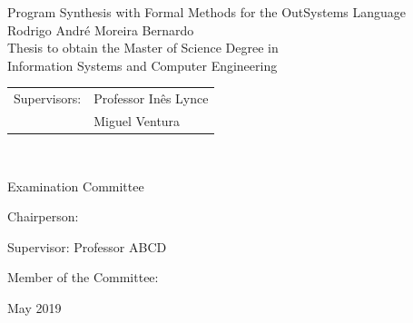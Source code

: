 \begin{center}

\vspace{2.5cm}

\vspace{1.0cm}
{\FontLb Program Synthesis with Formal Methods for the OutSystems Language} \\
\vspace{2.7cm}
{\FontMb Rodrigo André Moreira Bernardo} \\
\vspace{2.0cm}
{\FontSn Thesis to obtain the Master of Science Degree in} \\
\vspace{0.3cm}
{\FontLb Information Systems and Computer Engineering} \\
\vspace{1.1cm}
{\FontSn %
\begin{tabular}{ll}
	Supervisors: & Professor Inês Lynce \\
	             & Miguel Ventura \\
\end{tabular} } \\

\vspace{1.1cm}

{\FontMb Examination Committee} \\

\vspace{0.3cm}

{\FontSn %
Chairperson: 

Supervisor: Professor ABCD

Member of the Committee: 

}

\vspace{1.5cm}
{\FontMb May 2019} \\
%
\end{center}

\cleardoublepage

